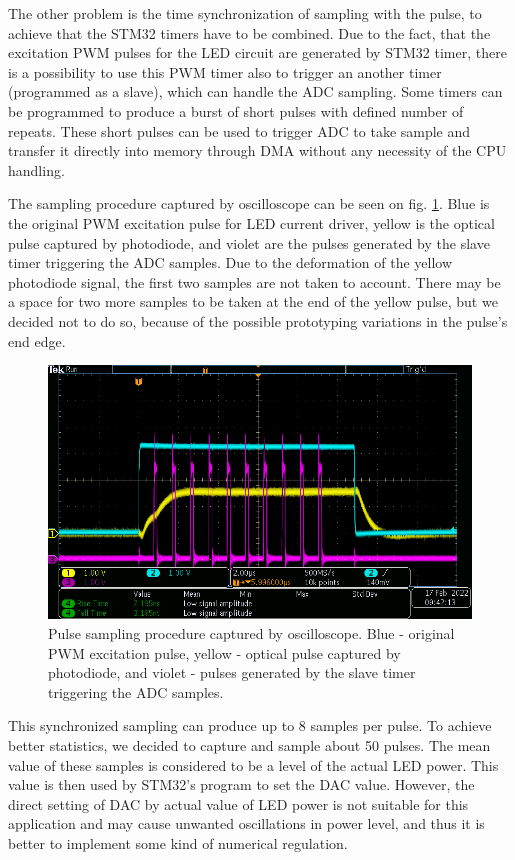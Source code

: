 \par

The other problem is the time synchronization of sampling with the pulse, to achieve that the STM32 timers have to be combined. Due to the fact, that the excitation PWM pulses for the LED circuit are generated by STM32 timer, there is a possibility to use this PWM timer also to trigger an another timer (programmed as a slave), which can handle the ADC sampling. Some timers can be programmed to produce a burst of short pulses with defined number of repeats. These short pulses can be used to trigger ADC to take sample and transfer it directly into memory through DMA without any necessity of the CPU handling.  
\par
The sampling procedure captured by oscilloscope can be seen on fig. \ref{procedure}. Blue is the original PWM excitation pulse for LED current driver, yellow is the optical pulse captured by photodiode, and violet are the pulses generated by the slave timer triggering the ADC samples. Due to the deformation of the yellow photodiode signal, the first two samples are not taken to account. 
There may be a space for two more samples to be taken at the end of the yellow pulse, but we decided not to do so, because of the possible prototyping variations in the pulse's end edge. 


\begin{figure}[H]
 \centering
 \includegraphics[scale=0.5]{./pictures/PWMSampling.png}
 \caption{Pulse sampling procedure captured by oscilloscope. Blue - original PWM excitation pulse, yellow - optical pulse captured by photodiode, and violet - pulses generated by the slave timer triggering the ADC samples.}
 \label{procedure}
\end{figure}
\par
This synchronized sampling can produce up to 8 samples per pulse. To achieve better statistics, we decided to capture and sample about 50 pulses. The mean value of these samples is considered to be a level of the actual LED power. This value is then used by STM32's program to set the DAC value. However, the direct setting of DAC by actual value of LED power is not suitable for this application and may cause unwanted oscillations in power level, and thus it is better to implement some kind of numerical regulation.


